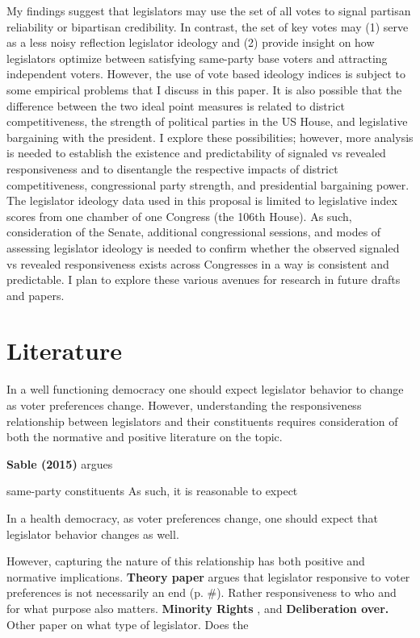 \documentclass[10pt,letterpaper]{article}
\begin{document}
My findings suggest that legislators may use the set of all votes to signal partisan reliability or bipartisan credibility. In contrast, the set of key votes may (1) serve as a less noisy reflection legislator ideology and (2) provide insight on how legislators optimize between satisfying same-party base voters and attracting independent voters. However, the use of vote based ideology indices is subject to some empirical problems that I discuss in this paper. It is also possible that the difference between the two ideal point measures is related to district competitiveness, the strength of political parties in the US House, and legislative bargaining with the president. I explore these possibilities; however, more analysis is needed to establish the existence and predictability of signaled vs revealed responsiveness and to disentangle the respective impacts of district competitiveness, congressional party strength, and presidential bargaining power. The legislator ideology data used in this proposal is limited to legislative index scores from one chamber of one Congress (the 106th House). As such, consideration of the Senate, additional congressional sessions, and modes of assessing legislator ideology is needed to confirm whether the observed signaled vs revealed responsiveness exists across Congresses in a way is consistent and predictable. I plan to explore these various avenues for research in future drafts and papers.

\section{Literature} 
In a well functioning democracy one should expect legislator behavior to change as voter preferences change. However, understanding the responsiveness relationship between legislators and their constituents requires consideration of both the normative and positive literature on the topic. 

\textbf{Sable (2015)} argues 


same-party constituents  
As such, it is reasonable to expect 

In a health democracy, as voter preferences change, one should expect that legislator behavior changes as well.

However, capturing the nature of this relationship has both positive and normative implications. \textbf{Theory paper} argues that legislator responsive to voter preferences is not necessarily an end (p. \#). Rather responsiveness to who and for what purpose also matters. \textbf{Minority Rights} , and \textbf{Deliberation over.} Other paper on what type of legislator. Does the %
\end{document}
